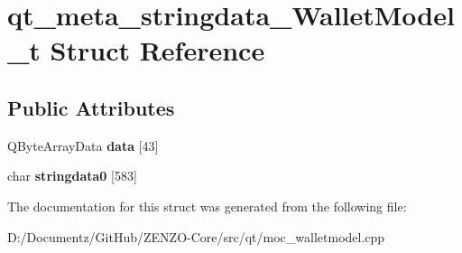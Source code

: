 \hypertarget{structqt__meta__stringdata___wallet_model__t}{}\section{qt\+\_\+meta\+\_\+stringdata\+\_\+\+Wallet\+Model\+\_\+t Struct Reference}
\label{structqt__meta__stringdata___wallet_model__t}
\subsection*{Public Attributes}
\begin{DoxyCompactItemize}
\item 
\mbox{\label{structqt__meta__stringdata___wallet_model__t_af6a9ac01f1e507909d9bae07984044b2}} 
Q\+Byte\+Array\+Data {\bfseries data} \mbox{[}43\mbox{]}
\item 
\mbox{\label{structqt__meta__stringdata___wallet_model__t_a013fa37e3466c09820a2b4d00830f134}} 
char {\bfseries stringdata0} \mbox{[}583\mbox{]}
\end{DoxyCompactItemize}


The documentation for this struct was generated from the following file\+:\begin{DoxyCompactItemize}
\item 
D\+:/\+Documentz/\+Git\+Hub/\+Z\+E\+N\+Z\+O-\/\+Core/src/qt/moc\+\_\+walletmodel.\+cpp\end{DoxyCompactItemize}
